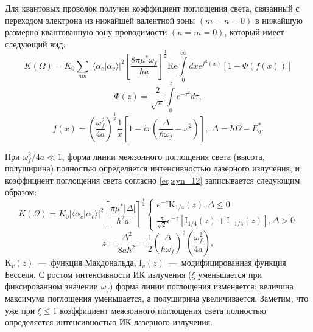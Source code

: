 Для квантовых проволок получен коэффициент поглощения света, связанный с переходом электрона из нижайшей валентной зоны $(m=n=0)$ в нижайшую размерно-квантованную зону проводимости $(n=m=0)$, который имеет следующий вид:
\begin{equation} \label{eq:syn_12}
K\left(\Omega\right)=K_0\sum_{nm}{ {\lvert\langle \alpha_c | \alpha_v \rangle\rvert}^2 {\left[\frac{8\pi \mu^*\omega_f}{\hbar a}\right]}^{\frac{1}{2}} \mathrm{Re} \int\limits_0^\infty {dx e^{f^2\left(x\right)}\left[1-\Phi \left(f\left(x\right)\right)\right]}}
\end{equation}
\[
\Phi \left(z\right)=\frac{2}{\sqrt{\pi}}\int\limits_0^z {e^{-\tau^2}}d\tau ,
\] 
\[
f\left(x\right)={\left(\frac{\omega^2_f}{4a}\right)}^{\frac{1}{2}}\frac{1}{x}\left[1-ix\left(\frac{\Delta }{\hbar \omega_f}-x^2\right)\right],\; \Delta =\hbar \Omega-E^*_g .
\] 

При $\omega^2_f / 4a \ll 1$, форма линии межзонного поглощения света (высота, полуширина) полностью определяется интенсивностью лазерного излучения, и коэффициент поглощения света согласно \eqref{eq:syn_12} записывается следующим образом:
\begin{equation} \label{eq:syn_13}
K(\Omega)=K_0 {\lvert\langle \alpha_c | \alpha_v \rangle\rvert}^2
{\left[\frac{\pi {\mu }^*\left|\Delta \right|}{{\hbar }^2a}\right]}^{\frac{1}{2}}
\begin{cases}
e^{-z} \mathrm{K}_{1/4}(z), \Delta \le 0 \\ 
\frac{\pi }{\sqrt{2}}e^{-z}[\mathrm{I}_{{1}/{4}}\left(z\right)+\mathrm{I}_{-1/4}\left(z\right)], \Delta >0
\end{cases}
\end{equation}
\[
z=\frac{\Delta^2}{8a\hbar^2}=\frac{1}{2}\left(\frac{\Delta}{\hbar\omega_f} \right)^2 \left(\frac{\omega_f^2}{4a} \right),
\]
$\mathrm{K}_v\left(z\right)$~---~функция Макдональда, $\mathrm{I}_v\left(z\right)$~---~модифицированная функция Бесселя.
С ростом интенсивности ИК излучения ($\xi $ уменьшается при фиксированном значении $\omega_f$) форма линии поглощения изменяется: величина максимума поглощения уменьшается, а полуширина увеличивается. Заметим, что уже при $\xi \le 1$ коэффициент межзонного поглощения света полностью определяется интенсивностью ИК лазерного излучения.

